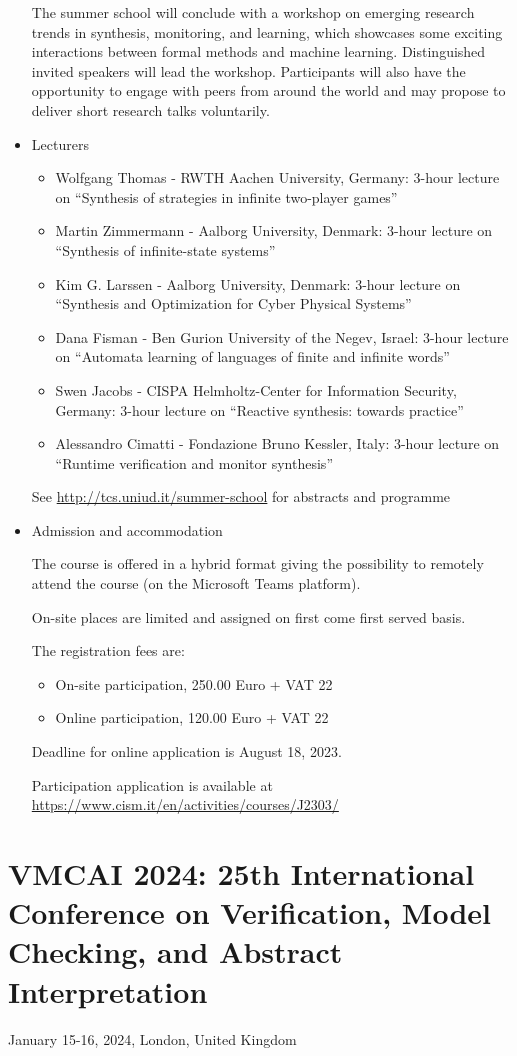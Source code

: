 \documentclass[prodmode,acmtecs]{acmsmall} %
\begin{document}
\begin{itemize}
  The summer school will conclude with a workshop on emerging research trends in synthesis, monitoring, and learning, which showcases some exciting interactions between formal methods and machine learning. Distinguished invited speakers will lead the workshop. Participants will also have the opportunity to engage with peers from around the world and may propose to deliver short research talks voluntarily. 
 
\item  Lecturers 
 
\begin{itemize}\item  Wolfgang Thomas - RWTH Aachen University, Germany: 3-hour lecture on “Synthesis of strategies in infinite two-player games”
\item  Martin Zimmermann - Aalborg University, Denmark: 3-hour lecture on “Synthesis of infinite-state systems”
\item  Kim G. Larssen - Aalborg University, Denmark: 3-hour lecture on “Synthesis and Optimization for Cyber Physical Systems”
\item  Dana Fisman - Ben Gurion University of the Negev, Israel: 3-hour lecture on “Automata learning of languages of finite and infinite words”
\item  Swen Jacobs - CISPA Helmholtz-Center for Information Security, Germany: 3-hour lecture on “Reactive synthesis: towards practice”
\item  Alessandro Cimatti - Fondazione Bruno Kessler, Italy: 3-hour lecture on “Runtime verification and monitor synthesis”
\end{itemize} 
  See \href{http://tcs.uniud.it/summer-school}{http://tcs.uniud.it/summer-school} for abstracts and programme 
 
\item  Admission and accommodation 
 
  The course is offered in a hybrid format giving the possibility to remotely attend the course (on the Microsoft Teams platform). 
 
  On-site places are limited and assigned on first come first served basis. 
 
  The registration fees are: 
 
\begin{itemize}\item  On-site participation, 250.00 Euro + VAT 22%
\item  Online participation, 120.00 Euro + VAT 22%
\end{itemize} 
  Deadline for online application is August 18, 2023.   
 
  Participation application is available at \href{https://www.cism.it/en/activities/courses/J2303/}{https://www.cism.it/en/activities/courses/J2303/} 
 
\end{itemize}\section{VMCAI 2024: 25th International Conference on Verification, Model Checking, and Abstract Interpretation}\label{VMCAI2024}  January 15-16, 2024, London, United Kingdom\\ 
\end{document}
